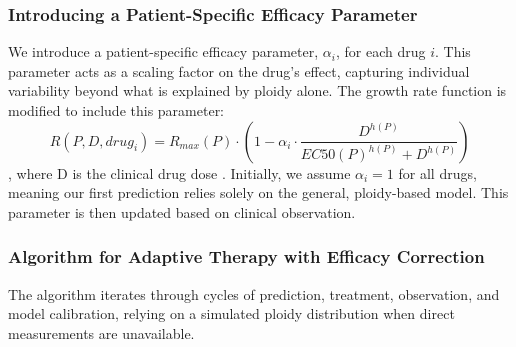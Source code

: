 \documentclass{article}
\begin{document}
\subsubsection*{Introducing a Patient-Specific Efficacy Parameter}
We introduce a patient-specific efficacy parameter, $\alpha_i$, for each drug $i$. This parameter acts as a scaling factor on the drug's effect, capturing individual variability beyond what is explained by ploidy alone. The growth rate function is modified to include this parameter:
$$
R(P, D, drug_i) = R_{max}(P) \cdot \left(1 - \alpha_i \cdot \frac{D^{h(P)}}{EC50(P)^{h(P)} + D^{h(P)}}\right)
$$
\color{blue}, where D is the clinical drug dose \color{black}. Initially, we assume $\alpha_i = 1$ for all drugs, meaning our first prediction relies solely on the general, ploidy-based model. This parameter is then updated based on clinical observation.

\subsubsection*{Algorithm for Adaptive Therapy with Efficacy Correction}
The algorithm iterates through cycles of prediction, treatment, observation, and model calibration, relying on a simulated ploidy distribution when direct measurements are unavailable.
\end{document}
